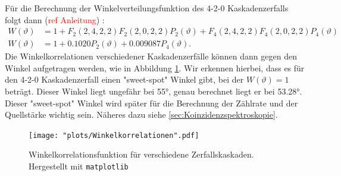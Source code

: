 \documentclass[%
aps,
onecolumn,
11pt,
tightenlines,
nofootinbib,
superscriptaddress,
floatfix,
prd,
]{revtex4-2}
\begin{document}
Für die Berechnung der Winkelverteilungsfunktion des 4-2-0 Kaskadenzerfalls folgt dann (\textcolor{red}{ref Anleitung})
:
\begin{align}
	W(\vartheta) &= 1 + F_2(2,4,2,2)F_2(2,0,2,2)P_2(\vartheta) + F_4(2,4,2,2)F_4(2,0,2,2)P_4(\vartheta) \\
	W(\vartheta) &= 1 + 0.1020 P_2(\vartheta) + 0.009087 P_4(\vartheta). \nonumber
\end{align}
Die Winkelkorrelationen verschiedener Kaskadenzerfälle können dann gegen den Winkel aufgetragen werden, wie in Abbildung \ref{fig:angularcorrelation}. Wir erkennen hierbei, dass es für den 4-2-0 Kaskadenzerfall einen "sweet-spot" Winkel gibt, bei der $W(\vartheta)=1$ beträgt. Dieser Winkel liegt ungefähr bei 55°, genau berechnet liegt er bei 53.28°. Dieser "sweet-spot" Winkel wird später für die Berechnung der Zählrate und der Quellstärke wichtig sein. Näheres dazu siehe \ref{sec:Koinzidenzspektroskopie}.
\begin{figure}[ht]
		\texttt{[image: "plots/Winkelkorrelationen".pdf]}
	\caption{Winkelkorrelationsfunktion für verschiedene Zerfallskaskaden. Hergestellt mit \texttt{matplotlib}}
	\label{fig:angularcorrelation}
\end{figure}
\end{document}
